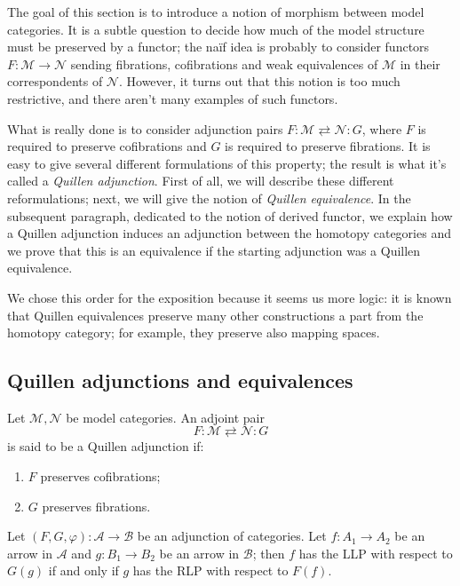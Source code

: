 \begin{refsection}
The goal of this section is to introduce a notion of morphism between model categories. It is a subtle question to decide how much of the model structure must be preserved by a functor; the na\"if idea is probably to consider functors $F \colon \mathcal M \to \mathcal N$ sending fibrations, cofibrations and weak equivalences of $\mathcal M$ in their correspondents of $\mathcal N$. However, it turns out that this notion is too much restrictive, and there aren't many examples of such functors.

What is really done is to consider adjunction pairs $F \colon \mathcal M \rightleftarrows \mathcal N \colon G$, where $F$ is required to preserve cofibrations and $G$ is required to preserve fibrations. It is easy to give several different formulations of this property; the result is what it's called a \emph{Quillen adjunction}. First of all, we will describe these different reformulations; next, we will give the notion of \emph{Quillen equivalence}. In the subsequent paragraph, dedicated to the notion of derived functor, we explain how a Quillen adjunction induces an adjunction between the homotopy categories and we prove that this is an equivalence if the starting adjunction was a Quillen equivalence.

We chose this order for the exposition because it seems us more logic: it is known that Quillen equivalences preserve many other constructions a part from the homotopy category; for example, they preserve also mapping spaces.

\subsection{Quillen adjunctions and equivalences}

\begin{defin}
Let $\mathcal M, \mathcal N$ be model categories. An adjoint pair
\[
F \colon \mathcal M \rightleftarrows \mathcal N \colon G
\]
is said to be a Quillen adjunction if:
\begin{enumerate}
\item $F$ preserves cofibrations;
\item $G$ preserves fibrations.
\end{enumerate}
\end{defin}

\begin{lemma} \label{lemma adjunction and lifting properties}
Let $(F,G,\varphi) \colon \mathcal A \to \mathcal B$ be an adjunction of categories. Let $f \colon A_1 \to A_2$ be an arrow in $\mathcal A$ and $g \colon B_1 \to B_2$ be an arrow in $\mathcal B$; then $f$ has the LLP with respect to $G(g)$ if and only if $g$ has the RLP with respect to $F(f)$.
\end{lemma}


\end{refsection}
